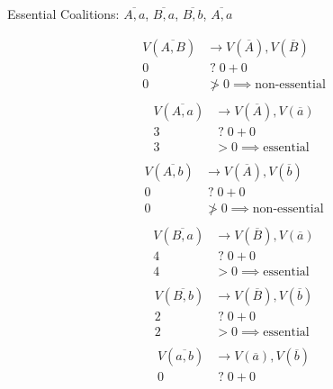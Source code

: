\documentclass{article}
\newcommand*{\unknown}[0]{\;?\;}
\begin{document}
\begin{enumerate}
\begin{enumerate}
    Essential Coalitions: $\overline{A, a}$, $\overline{B, a}$, $\overline{B, b}$, $\overline{A, a}$

    \begin{align*}
    V(\overline{A, B}) &\rightarrow V(\overline{A}), V(\overline{B}) \\
    0                  &\unknown    0              + 0 \\
    0                  &\not>       0                  \implies \text{non-essential} \\
    \end{align*}
    \begin{align*}
    V(\overline{A, a}) &\rightarrow V(\overline{A}), V(\overline{a}) \\
    3                  &\unknown    0              + 0 \\
    3                  &>           0                  \implies \text{essential} \\
    \end{align*}
    \begin{align*}
    V(\overline{A, b}) &\rightarrow V(\overline{A}), V(\overline{b}) \\
    0                  &\unknown    0              + 0 \\
    0                  &\not>       0                  \implies \text{non-essential} \\
    \end{align*}
    \begin{align*}
    V(\overline{B, a}) &\rightarrow V(\overline{B}), V(\overline{a}) \\
    4                  &\unknown    0              + 0 \\
    4                  &>           0                  \implies \text{essential} \\
    \end{align*}
    \begin{align*}
    V(\overline{B, b}) &\rightarrow V(\overline{B}), V(\overline{b}) \\
    2                  &\unknown    0              + 0 \\
    2                  &>           0                  \implies \text{essential} \\
    \end{align*}
    \begin{align*}
    V(\overline{a, b}) &\rightarrow V(\overline{a}), V(\overline{b}) \\
    0                  &\unknown    0              + 0 \\

\end{align*}
\end{enumerate}
\end{enumerate}
\end{document}
